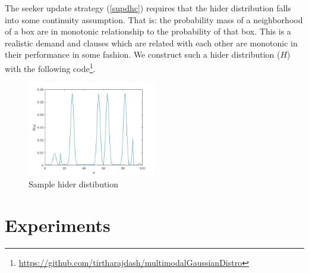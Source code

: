 \documentclass[11pt,a4paper]{article}
\begin{document}
\noindent
The seeker update strategy (\ref{supdhc}) requires that the hider distribution falls into some continuity assumption. That is: the probability mass of a neighborhood of a box are in monotonic relationship to the probability of that box. This is a realistic demand and clauses which are related with each other are monotonic in their performance in some fashion. We construct such a hider distribution ($H$) with the following code\footnote{\url{https://github.com/tirtharajdash/multimodalGaussianDistro}}.

\begin{figure}[h]
	\centering
	\includegraphics[width=0.5\textwidth]{sample.jpg}
	\caption{Sample hider distibution}
\end{figure}
	

\section{Experiments} \label{base_expt}
\end{document}
